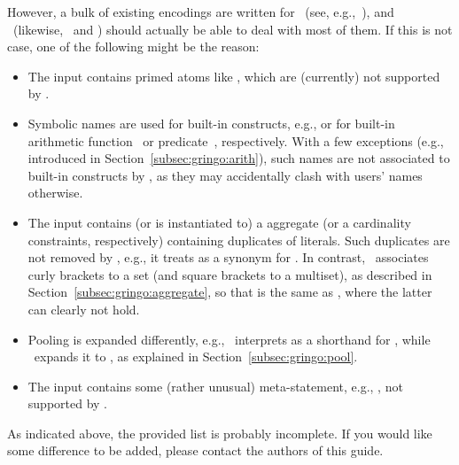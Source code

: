 However, a bulk of existing encodings are written for \lparse\
(see, e.g.,~\cite{asparagus}),
and \gringo\ (likewise, \clingo\ and \iclingo) should actually be able to deal with most of them.
If this is not case, one of the following might be the reason:
%
\begin{itemize}
\item
The input contains primed atoms like , which are (currently) not supported by \gringo.
\item
Symbolic names are used for built-in constructs, e.g.,  or 
for built-in arithmetic function~\code{+} or predicate~\code{==}, respectively.
With a few exceptions (e.g., \const{abs} introduced in Section~\ref{subsec:gringo:arith}),
such names are not associated to built-in constructs by \gringo,
as they may accidentally clash with users' names otherwise.
\item
The input contains (or is instantiated to) 
a  aggregate (or a cardinality constraints, respectively)
containing duplicates of literals.
Such duplicates are not removed by \lparse, e.g.,
it treats 
as a synonym for \code{2[\pred{p}(\const{c})=1,\pred{p}(\const{c})=1]}.
In contrast, \gringo\ associates curly brackets to a set
(and square brackets to a multiset), as described in Section~\ref{subsec:gringo:aggregate}, so that
\code{2\char`\{\pred{p}(\const{c}),\pred{p}(\const{c})\char`\}} is the same as
\code{2\char`\{\pred{p}(\const{c})\char`\}},
where the latter can clearly not hold.
\item
Pooling is expanded differently,
e.g.,
\lparse\ interprets
as a shorthand for
,
while \gringo\ expands it to
,
as explained in Section~\ref{subsec:gringo:pool}.
\item
The input contains some (rather unusual) meta-statement, e.g.,
, not supported by \gringo.
\end{itemize}
%
As indicated above, the provided list is probably incomplete.
If you would like some difference to be added,
please contact the authors of this guide.


